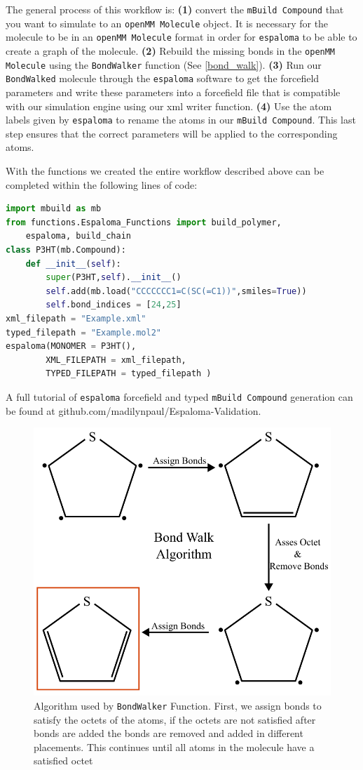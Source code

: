 The general process of this workflow is: \textbf{(1)} convert the \texttt{mBuild Compound} that you want to simulate to an \texttt{openMM Molecule} object. It is necessary for the molecule to be in an \texttt{openMM Molecule} format in order for \texttt{espaloma} to be able to create a graph of the molecule. \textbf{(2)} Rebuild the missing bonds in the \texttt{openMM Molecule} using the \texttt{BondWalker} function (See \autoref{bond_walk}). \textbf{(3)} Run our \texttt{BondWalked} molecule through the \texttt{espaloma} software to get the forcefield parameters and write these parameters into a forcefield file that is compatible with our simulation engine using our xml writer function. \textbf{(4)} Use the atom labels given by \texttt{espaloma} to rename the atoms in our \texttt{mBuild Compound}. This last step ensures that the correct parameters will be applied to the corresponding atoms. 

With the functions we created the entire workflow described above can be completed within the following lines of code: 
\begin{lstlisting}[language=Python]
import mbuild as mb
from functions.Espaloma_Functions import build_polymer, 
    espaloma, build_chain
class P3HT(mb.Compound):
    def __init__(self):
        super(P3HT,self).__init__()
        self.add(mb.load("CCCCCCC1=C(SC(=C1))",smiles=True))
        self.bond_indices = [24,25]
xml_filepath = "Example.xml"
typed_filepath = "Example.mol2"
espaloma(MONOMER = P3HT(),
        XML_FILEPATH = xml_filepath,
        TYPED_FILEPATH = typed_filepath )
\end{lstlisting}
A full tutorial of \texttt{espaloma} forcefield and typed \texttt{mBuild Compound} generation can be found at github.com/madilynpaul/Espaloma-Validation. 

\begin{figure}[ht]
    \centering
    \includegraphics[width=0.7\linewidth]{src/figures/FF_figs/bondwalk_algorithm.png}
    \caption{Algorithm used by \texttt{BondWalker} Function. First, we assign bonds to satisfy the octets of the atoms, if the octets are not satisfied after bonds are added the bonds are removed and added in different placements. This continues until all atoms in the molecule have a satisfied octet}
    \label{bond_walk}
\end{figure}

